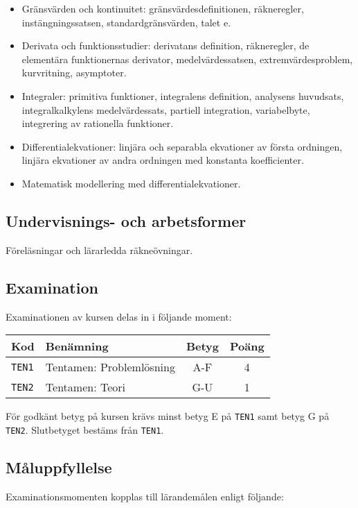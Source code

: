 \begin{itemize}
\tightlist
\item
  Gränsvärden och kontinuitet: gränsvärdesdefinitionen, räkneregler,
  instängningssatsen, standardgränsvärden, talet e.
\item
  Derivata och funktionsstudier: derivatans definition, räkneregler, de
  elementära funktionernas derivator, medelvärdessatsen,
  extremvärdesproblem, kurvritning, asymptoter.
\item
  Integraler: primitiva funktioner, integralens definition, analysens
  huvudsats, integralkalkylens medelvärdessats, partiell integration,
  variabelbyte, integrering av rationella funktioner.
\item
  Differentialekvationer: linjära och separabla ekvationer av första
  ordningen, linjära ekvationer av andra ordningen med konstanta
  koefficienter.
\item
  Matematisk modellering med differentialekvationer.
\end{itemize}

\subsection*{Undervisnings- och
arbetsformer}

Föreläsningar och lärarledda räkneövningar.

\subsection*{Examination}

Examinationen av kursen delas in i följande moment:

\begin{longtable}[]{@{}llcc@{}}
\toprule
\textsf{Kod} & \textsf{Benämning} & \textsf{Betyg} & \textsf{Poäng}\tabularnewline
\midrule
\endhead
\texttt{TEN1} & Tentamen: Problemlösning & A-F & 4\tabularnewline
\texttt{TEN2} & Tentamen: Teori & G-U & 1\tabularnewline
\bottomrule
\end{longtable}

För godkänt betyg på kursen krävs minst betyg E på \texttt{TEN1} samt betyg G på
\texttt{TEN2}. Slutbetyget bestäms från \texttt{TEN1}.

\subsection*{Måluppfyllelse}

Examinationsmomenten kopplas till lärandemålen enligt följande:

